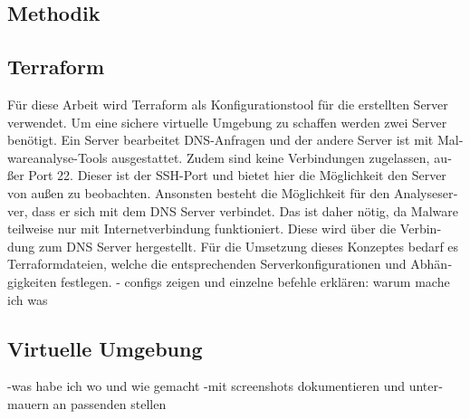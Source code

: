 \begin{otherlanguage}{ngerman}
\section{Methodik}
\subsection{Terraform}\label{Praktisches Terraform}
Für diese Arbeit wird Terraform als Konfigurationstool für die erstellten Server verwendet. Um eine sichere virtuelle Umgebung zu schaffen werden zwei Server benötigt. Ein Server bearbeitet DNS-Anfragen und der andere Server ist mit Malwareanalyse-Tools ausgestattet. Zudem sind keine Verbindungen zugelassen, außer Port 22. Dieser ist der SSH-Port und bietet hier die Möglichkeit den Server von außen zu beobachten. Ansonsten besteht die Möglichkeit für den Analyseserver, dass er sich mit dem DNS Server verbindet. Das ist daher nötig, da Malware teilweise nur mit Internetverbindung funktioniert. Diese wird über die Verbindung zum DNS Server hergestellt. 
\newline
Für die Umsetzung dieses Konzeptes bedarf es Terraformdateien, welche die entsprechenden Serverkonfigurationen und Abhängigkeiten festlegen.
\newline
- configs zeigen und einzelne befehle erklären: warum mache ich was
\subsection{Virtuelle Umgebung}
-was habe ich wo und wie gemacht
\newline
-mit screenshots dokumentieren und untermauern an passenden stellen
\end{otherlanguage}